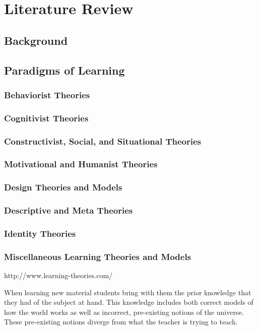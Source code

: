 \chapter[Chapter 2: Literature Review]{Literature Review}

\section{Background}



\section{Paradigms of Learning}

\subsection{Behaviorist Theories}
\subsection{Cognitivist Theories}
\subsection{Constructivist, Social, and Situational Theories}
\subsection{Motivational and Humanist Theories}
\subsection{Design Theories and Models}
\subsection{Descriptive and Meta Theories}
\subsection{Identity Theories}
\subsection{Miscellaneous Learning Theories and Models}


http://www.learning-theories.com/

When learning new material students bring with them the prior knowledge that they had of the subject at hand. This knowledge includes both correct models of how the world works as well as incorrect, pre-existing notions of the universe. These pre-existing notions diverge from what the teacher is trying to teach.

